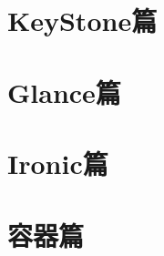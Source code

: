 \documentclass[openany,twoside]{book}
\begin{document}
\begin{titlepage}
	\\
	\vspace{\fill}
	\\
	\vspace{80mm}
\end{titlepage}

\newpage
\let\cleardoublepage\clearpage
\frontmatter
{
  \renewcommand*\contentsname{目录}
  \tableofcontents%
  \thispagestyle{empty}
}

\mainmatter

\part{KeyStone篇}



\part{Glance篇}

\part{Ironic篇}




\part{容器篇}


\end{document}
